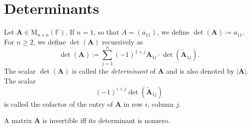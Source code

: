 \documentclass[../Notes.tex]{subfiles}
\begin{document}
\section{Determinants}
\begin{definition}{}{}
    Let \(\mathbf{A}\in \mathrm{M}_{n\times n}(\mathbb{F})\). If \(n=1\), so that \(A=(a_{11})\), we define \(\det(\mathbf{A})\coloneq a_{11}\). For \(n\geq 2\), we define \(\det(\mathbf{A})\) recursively as 
    \[\det(\mathbf{A})\coloneq \sum_{j=1}^{n}{(-1)^{1+j}}\mathbf{A}_{1j}\cdot \det(\widetilde{\mathbf{A}}_{1j}).\]
    The scalar \(\det(\mathbf{A})\) is called the \emph{determinant} of \(\mathbf{A}\) and is also denoted by \(\lvert \mathbf{A} \rvert\). The scalar 
    \[(-1)^{i+j}\det(\widetilde{\mathbf{A}}_{1j})\]
    is called the cofactor of the entry of \(\mathbf{A}\) in row \(i\), column \(j\).
\end{definition}
\begin{note}
    A matrix \(\mathbf{A}\) is invertible iff its determinant is nonzero. 
\end{note}
\end{document}
